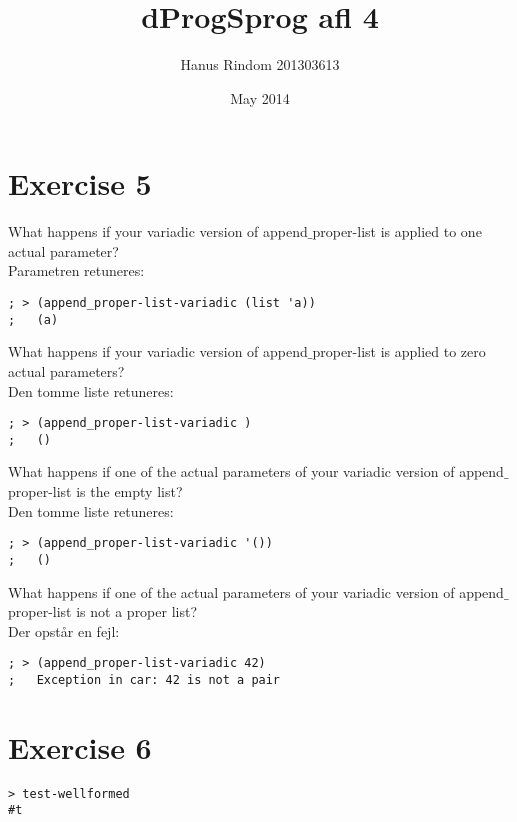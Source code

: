 \documentclass{article}
\title{dProgSprog afl 4}
\author{Hanus Rindom 201303613}
\date{May 2014}
\begin{document}
\maketitle

\section*{Exercise 5}
What happens if your variadic version of append$\_$proper-list is applied to one actual parameter?\\
Parametren retuneres:
\begin{verbatim}
; > (append_proper-list-variadic (list 'a))
;   (a)
\end{verbatim}

What happens if your variadic version of append$\_$proper-list is applied to zero actual parameters?\\
Den tomme liste retuneres:
\begin{verbatim}
; > (append_proper-list-variadic )
;   ()
\end{verbatim}

What happens if one of the actual parameters of your variadic version of append$\_$proper-list is the empty list?\\
Den tomme liste retuneres:
\begin{verbatim}
; > (append_proper-list-variadic '())
;   ()
\end{verbatim}

What happens if one of the actual parameters of your variadic version of append$\_$proper-list is not a proper list?\\
Der opstår en fejl:
\begin{verbatim}
; > (append_proper-list-variadic 42)
;	Exception in car: 42 is not a pair
\end{verbatim}
\section*{Exercise 6}

\begin{verbatim}
> test-wellformed
#t

\end{verbatim}
\end{document}
